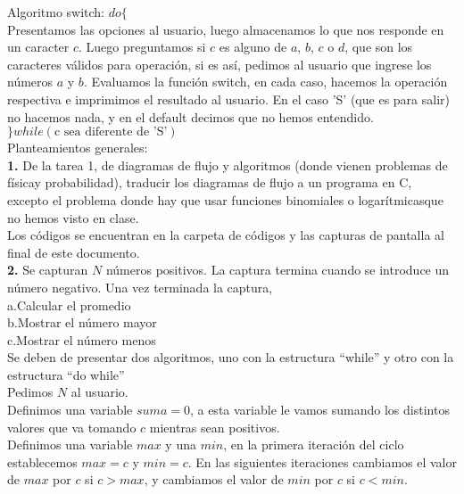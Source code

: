 \documentclass{article}
\begin{document}
Algoritmo switch: $do\{ $\\

Presentamos las opciones al usuario, luego almacenamos lo que nos responde en un caracter $c$. Luego preguntamos si $c$ es alguno de $a$, $b$, $c$ o $d$, que son los caracteres válidos para operación, si es así, pedimos al usuario que ingrese los números $a$ y $b$. Evaluamos la función switch, en cada caso, hacemos la operación respectiva e imprimimos el resultado al usuario. En el caso 'S' (que es para salir) no hacemos nada, y en el default decimos que no hemos entendido.\\

$\}while(\text{c sea diferente de 'S'})$\\


Planteamientos generales:\\

\textbf{1.} De la tarea 1, de diagramas de flujo y algoritmos (donde vienen problemas de físicay probabilidad), traducir los diagramas de flujo a un programa en C, excepto el problema donde hay que usar funciones binomiales o logarítmicasque no hemos visto en clase.\\

Los códigos se encuentran en la carpeta de códigos y las capturas de pantalla al final de este documento.\\

\textbf{2.} Se capturan $N$ números positivos. La captura termina cuando se introduce un número negativo. Una vez terminada la captura,\\
a.Calcular el promedio\\
b.Mostrar el número mayor\\
c.Mostrar el número menos\\
Se deben de presentar dos algoritmos, uno con la estructura “while” y otro con la estructura “do while”\\

Pedimos $N$ al usuario.\\

Definimos una variable $suma = 0$, a esta variable le vamos sumando los distintos valores que va tomando $c$ mientras sean positivos.\\ 

Definimos una variable $max$ y una $min$, en la primera iteración del ciclo establecemos $max = c$ y $min = c$. En las siguientes iteraciones cambiamos el valor de $max$ por $c$ si $c > max$, y cambiamos el valor de $min$ por $c$ si $c < min$.\\
\end{document}
